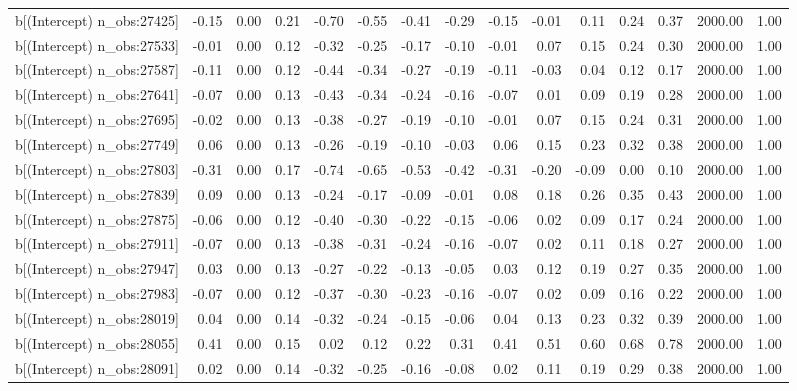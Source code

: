 \begin{table}[ht]
\begin{tabular}{rrrrrrrrrrrrrrr}
  b[(Intercept) n\_obs:27425] & -0.15 & 0.00 & 0.21 & -0.70 & -0.55 & -0.41 & -0.29 & -0.15 & -0.01 & 0.11 & 0.24 & 0.37 & 2000.00 & 1.00 \\ 
  b[(Intercept) n\_obs:27533] & -0.01 & 0.00 & 0.12 & -0.32 & -0.25 & -0.17 & -0.10 & -0.01 & 0.07 & 0.15 & 0.24 & 0.30 & 2000.00 & 1.00 \\ 
  b[(Intercept) n\_obs:27587] & -0.11 & 0.00 & 0.12 & -0.44 & -0.34 & -0.27 & -0.19 & -0.11 & -0.03 & 0.04 & 0.12 & 0.17 & 2000.00 & 1.00 \\ 
  b[(Intercept) n\_obs:27641] & -0.07 & 0.00 & 0.13 & -0.43 & -0.34 & -0.24 & -0.16 & -0.07 & 0.01 & 0.09 & 0.19 & 0.28 & 2000.00 & 1.00 \\ 
  b[(Intercept) n\_obs:27695] & -0.02 & 0.00 & 0.13 & -0.38 & -0.27 & -0.19 & -0.10 & -0.01 & 0.07 & 0.15 & 0.24 & 0.31 & 2000.00 & 1.00 \\ 
  b[(Intercept) n\_obs:27749] & 0.06 & 0.00 & 0.13 & -0.26 & -0.19 & -0.10 & -0.03 & 0.06 & 0.15 & 0.23 & 0.32 & 0.38 & 2000.00 & 1.00 \\ 
  b[(Intercept) n\_obs:27803] & -0.31 & 0.00 & 0.17 & -0.74 & -0.65 & -0.53 & -0.42 & -0.31 & -0.20 & -0.09 & 0.00 & 0.10 & 2000.00 & 1.00 \\ 
  b[(Intercept) n\_obs:27839] & 0.09 & 0.00 & 0.13 & -0.24 & -0.17 & -0.09 & -0.01 & 0.08 & 0.18 & 0.26 & 0.35 & 0.43 & 2000.00 & 1.00 \\ 
  b[(Intercept) n\_obs:27875] & -0.06 & 0.00 & 0.12 & -0.40 & -0.30 & -0.22 & -0.15 & -0.06 & 0.02 & 0.09 & 0.17 & 0.24 & 2000.00 & 1.00 \\ 
  b[(Intercept) n\_obs:27911] & -0.07 & 0.00 & 0.13 & -0.38 & -0.31 & -0.24 & -0.16 & -0.07 & 0.02 & 0.11 & 0.18 & 0.27 & 2000.00 & 1.00 \\ 
  b[(Intercept) n\_obs:27947] & 0.03 & 0.00 & 0.13 & -0.27 & -0.22 & -0.13 & -0.05 & 0.03 & 0.12 & 0.19 & 0.27 & 0.35 & 2000.00 & 1.00 \\ 
  b[(Intercept) n\_obs:27983] & -0.07 & 0.00 & 0.12 & -0.37 & -0.30 & -0.23 & -0.16 & -0.07 & 0.02 & 0.09 & 0.16 & 0.22 & 2000.00 & 1.00 \\ 
  b[(Intercept) n\_obs:28019] & 0.04 & 0.00 & 0.14 & -0.32 & -0.24 & -0.15 & -0.06 & 0.04 & 0.13 & 0.23 & 0.32 & 0.39 & 2000.00 & 1.00 \\ 
  b[(Intercept) n\_obs:28055] & 0.41 & 0.00 & 0.15 & 0.02 & 0.12 & 0.22 & 0.31 & 0.41 & 0.51 & 0.60 & 0.68 & 0.78 & 2000.00 & 1.00 \\ 
  b[(Intercept) n\_obs:28091] & 0.02 & 0.00 & 0.14 & -0.32 & -0.25 & -0.16 & -0.08 & 0.02 & 0.11 & 0.19 & 0.29 & 0.38 & 2000.00 & 1.00 \\ 

\end{tabular}
\end{table}
